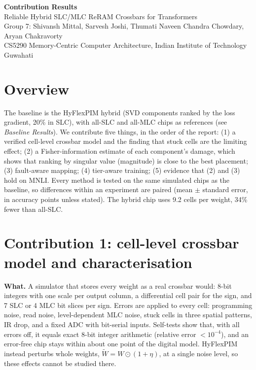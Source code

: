 \documentclass[10pt,a4paper]{article}
\begin{document}
\begin{center}
{\LARGE\bfseries Contribution Results}\\[4pt]
{\large Reliable Hybrid SLC/MLC ReRAM Crossbars for Transformers}\\[4pt]
Group 7: Shivansh Mittal, Sarvesh Joshi, Thumati Naveen Chandra Chowdary, Aryan Chakravorty\\
CS5290 Memory-Centric Computer Architecture, Indian Institute of Technology Guwahati
\end{center}

\section*{Overview}
The baseline is the HyFlexPIM hybrid (SVD components ranked by the loss gradient, 20\% in SLC), with all-SLC and
all-MLC chips as references (see \emph{Baseline Results}). We contribute five things, in the order of the
report: (1) a verified cell-level crossbar model and the finding that stuck cells are the limiting effect;
(2) a Fisher-information estimate of each component's damage, which shows that ranking by singular value
(magnitude) is close to the best placement; (3) fault-aware mapping; (4) tier-aware training; (5) evidence
that (2) and (3) hold on MNLI. Every method is tested on the same simulated chips as the baseline, so
differences within an experiment are paired (mean $\pm$ standard error, in accuracy points unless stated). The
hybrid chip uses 9.2 cells per weight, 34\% fewer than all-SLC.

\section{Contribution 1: cell-level crossbar model and characterisation}
\textbf{What.} A simulator that stores every weight as a real crossbar would: 8-bit integers with one scale
per output column, a differential cell pair for the sign, and 7 SLC or 4 MLC bit slices per sign. Errors are
applied to every cell: programming noise, read noise, level-dependent MLC noise, stuck cells in three spatial
patterns, IR drop, and a fixed ADC with bit-serial inputs. Self-tests show that, with all errors off, it
equals exact 8-bit integer arithmetic (relative error $<10^{-4}$), and an error-free chip stays within about one
point of the digital model. HyFlexPIM instead perturbs whole weights, $\tilde W=W\odot(1+\eta)$, at a single
noise level, so these effects cannot be studied there.
\end{document}
